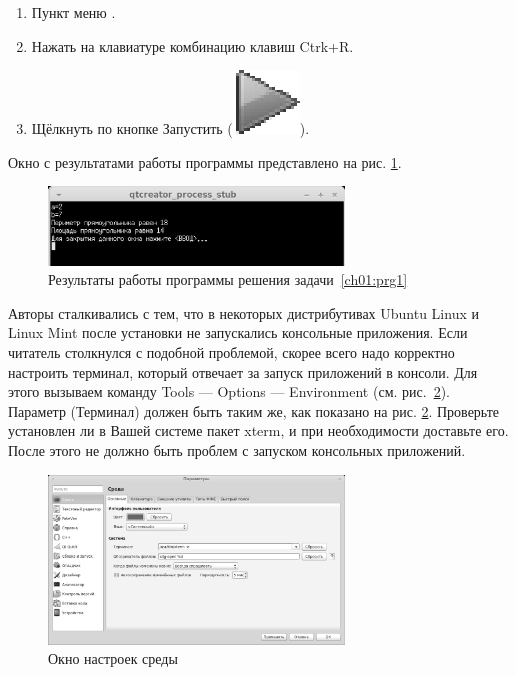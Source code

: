\begin{enumerate}
\item Пункт меню .
\item Нажать на клавиатуре комбинацию клавиш Ctrk+R.
\item Щёлкнуть по кнопке Запустить (\includegraphics[scale=0.33]{img/rightarrow}).
\end{enumerate}
Окно с результатами работы программы представлено на рис. \ref{ch01:refDrawing4}.
\begin{figure}[htb]
\begin{center}
\includegraphics[width=0.7\textwidth]{img/ris_1_5}
\caption{Результаты работы программы решения задачи~\ref{ch01:prg1}}
\label{ch01:refDrawing4}
\end{center}
\end{figure}

Авторы сталкивались с тем, что в некоторых дистрибутивах Ubuntu Linux и Linux Mint после установки  не
запускались консольные приложения. Если читатель столкнулся с подобной проблемой, скорее всего надо корректно настроить
терминал, который отвечает за запуск приложений в консоли. Для этого вызываем команду Tools --- Options --- Environment
(см. рис.~\ref{ch01:refDrawing5}). Параметр  (Терминал) должен быть таким же, как показано на рис.
\ref{ch01:refDrawing5}. Проверьте установлен ли в Вашей системе пакет xterm, и при необходимости доставьте его. После
этого не должно быть проблем с запуском консольных приложений.

\begin{figure}[htb]
\begin{center}
\includegraphics[width=0.7\textwidth]{img/ris_1_6}
\caption{Окно настроек среды }
\label{ch01:refDrawing5}
\end{center}
\end{figure}


